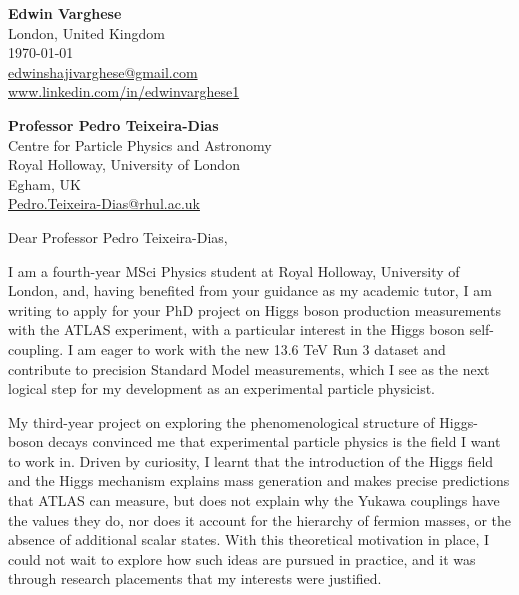 \documentclass[11pt]{report}
\begin{document}
	\begin{titlepage}
		
		\begin{minipage}[t]{0.90\textwidth}
			\hfill
			\raggedleft
			\textbf{Edwin Varghese} \\
			London, United Kingdom \\
			\today\\
			\href{mailto:edwinshajivarghese@gmail.com}{edwinshajivarghese@gmail.com} \\
			\url{www.linkedin.com/in/edwinvarghese1}
		\end{minipage}
		
		\raggedright \textbf{Professor Pedro Teixeira-Dias} \\ Centre for Particle Physics and Astronomy \\ Royal Holloway, University of London\\ Egham, UK\\ \href{mailto:Pedro.Teixeira-Dias@rhul.ac.uk}{Pedro.Teixeira-Dias@rhul.ac.uk}\\
		
		\vspace{0.9em}
		
		\raggedright Dear Professor Pedro Teixeira-Dias,\\
		\vspace{0.9em}
		
I am a fourth-year MSci Physics student at Royal Holloway, University of London, and, having benefited from your guidance as my academic tutor, I am writing to apply for your PhD project on Higgs boson production measurements with the ATLAS experiment, with a particular interest in the Higgs boson self-coupling. I am eager to work with the new 13.6 TeV Run 3 dataset and contribute to precision Standard Model measurements, which I see as the next logical step for my development as an experimental particle physicist.\\
\vspace{0.9em}


My third-year project on exploring the phenomenological structure of Higgs-boson decays convinced me that experimental particle physics is the field I want to work in. Driven by curiosity, I learnt that the introduction of the Higgs field and the Higgs mechanism explains mass generation and makes precise predictions that ATLAS can measure, but does not explain why the Yukawa couplings have the values they do, nor does it account for the hierarchy of fermion masses, or the absence of additional scalar states. With this theoretical motivation in place, I could not wait to explore how such ideas are pursued in practice, and it was through research placements that my interests were justified.\\
\vspace{0.9em}



\end{titlepage}
\end{document}
